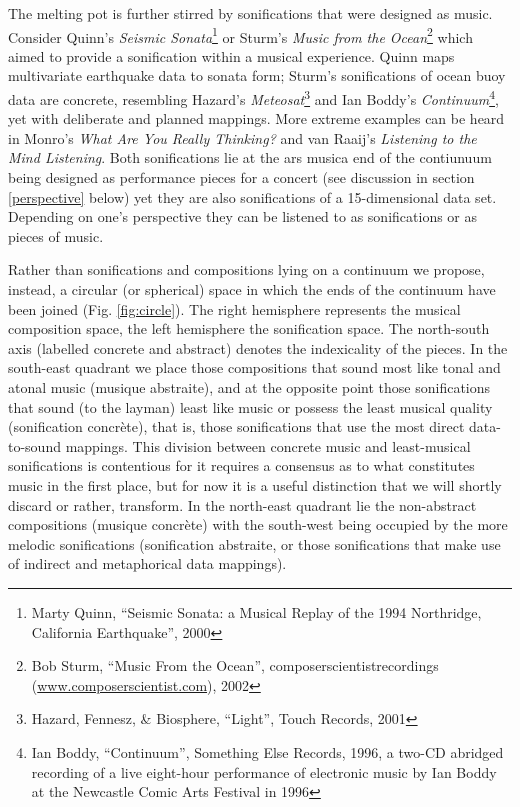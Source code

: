 \documentclass{article}
\begin{document}
The melting pot is further stirred by sonifications that were designed as music. Consider Quinn's \textit{Seismic Sonata}\footnote{Marty Quinn, ``Seismic Sonata: a Musical Replay of the 1994 Northridge, California Earthquake'', 2000} or Sturm's \textit{Music from the Ocean}\footnote{Bob Sturm, ``Music From the Ocean'', composerscientistrecordings (\url{www.composerscientist.com}), 2002} which aimed to provide a sonification within a musical experience. Quinn maps multivariate earthquake data to sonata form; Sturm's sonifications of ocean buoy data are concrete, resembling Hazard's \textit{Meteosat}\footnote{Hazard, Fennesz, \& Biosphere, ``Light'', Touch Records, 2001} and Ian Boddy's \textit{Continuum}\footnote{Ian Boddy, ``Continuum'', Something Else Records, 1996, a two-CD abridged recording of a live eight-hour performance of electronic music by Ian Boddy at the Newcastle Comic Arts Festival in 1996}, yet with deliberate and planned mappings. More extreme examples can be heard in Monro's \textit{What Are You Really Thinking?} and van Raaij's \textit{Listening to the Mind Listening}. Both sonifications lie at the ars musica end of the contiunuum being designed as performance pieces for a concert (see discussion in section \ref{perspective} below) yet they are also sonifications of a 15-dimensional data set. Depending on one's perspective they can be listened to as sonifications or as pieces of music. 


Rather than sonifications and compositions lying on a continuum we propose, instead, a circular (or spherical) space in which the ends of the continuum have been joined (Fig. \ref{fig:circle}). The right hemisphere represents the musical composition space, the left hemisphere the sonification space. The north-south axis (labelled concrete and abstract) denotes the indexicality of the pieces. In the south-east quadrant we place those compositions that sound most like tonal and atonal music (musique abstraite), and at the opposite point those sonifications that sound (to the layman) least like music or possess the least musical quality (sonification concrète), that is, those sonifications that use the most direct data-to-sound mappings. This division between concrete music and least-musical sonifications is contentious for it requires a consensus as to what constitutes music in the first place, but for now it is a useful distinction that we will shortly discard or rather, transform. In the north-east quadrant lie the non-abstract compositions (musique concrète) with the south-west being occupied by the more melodic sonifications (sonification abstraite, or those sonifications that make use of indirect and metaphorical data mappings).  
\end{document}
